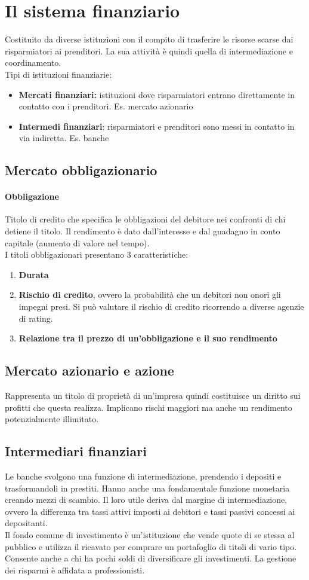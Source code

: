 \documentclass{report}
\begin{document}
	\section{Il sistema finanziario}
	Costituito da diverse istituzioni con il compito di trasferire le risorse scarse dai risparmiatori ai prenditori. La sua attività è quindi quella di intermediazione e coordinamento.
	\medskip \\
	Tipi di istituzioni finanziarie:
	\begin{itemize}
		\item \textbf{Mercati finanziari:} istituzioni dove risparmiatori entrano direttamente in contatto con i prenditori. Es. mercato azionario
		\item \textbf{Intermedi finanziari}: risparmiatori e prenditori sono messi in contatto in via indiretta. Es. banche
	\end{itemize}
	\subsection{Mercato obbligazionario}
	\paragraph{Obbligazione} Titolo di credito che specifica le obbligazioni del debitore nei confronti di chi detiene il titolo. Il rendimento è dato dall'interesse e dal guadagno in conto capitale (aumento di valore nel tempo).
	\medskip \\I titoli obbligazionari presentano 3 caratteristiche:
	\begin{enumerate}
		\item \textbf{Durata}
		\item \textbf{Rischio di credito}, ovvero la probabilità che un debitori non onori gli impegni presi. Si può valutare il rischio di credito ricorrendo a diverse agenzie di rating.
		\item \textbf{Relazione tra il prezzo di un'obbligazione e il suo rendimento}
	\end{enumerate}
	\subsection{Mercato azionario e azione} Rappresenta un titolo di proprietà di un'impresa quindi costituisce un diritto sui profitti che questa realizza. Implicano rischi maggiori ma anche un rendimento potenzialmente illimitato.
	\subsection{Intermediari finanziari}
	Le banche svolgono una funzione di intermediazione, prendendo i depositi e trasformandoli in prestiti. Hanno anche una fondamentale funzione monetaria creando mezzi di scambio. Il loro utile deriva dal margine di intermediazione, ovvero la differenza tra tassi attivi imposti ai debitori e tassi passivi concessi ai depositanti.
	\medskip \\Il fondo comune di investimento è un'istituzione che vende quote di se stessa al pubblico e utilizza il ricavato per comprare un portafoglio di titoli di vario tipo. Consente anche a chi ha pochi soldi di diversificare gli investimenti. La gestione dei risparmi è affidata a professionisti.
\end{document}
